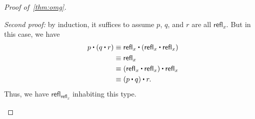 \documentclass[10pt,a4paper]{article}
\newcommand{\jdeq}{\equiv}      %
\newcommand{\refl}[1]{\ensuremath{\mathsf{refl}_{#1}}\xspace}
\newcommand{\ct}{%
  \mathchoice{\mathbin{\raisebox{0.5ex}{$\displaystyle\centerdot$}}}%
             {\mathbin{\raisebox{0.5ex}{$\centerdot$}}}%
             {\mathbin{\raisebox{0.25ex}{$\scriptstyle\,\centerdot\,$}}}%
             {\mathbin{\raisebox{0.1ex}{$\scriptscriptstyle\,\centerdot\,$}}}
}
\theoremstyle{definition}
\theoremstyle{remark}
\numberwithin{equation}{section}
\newcommand{\mentalpause}{\medskip} %
\begin{document}
\begin{proof}[Proof of~\cref{thm:omg}]
\begin{enumerate}
    \mentalpause

    \noindent \emph{Second proof:} by induction, it suffices to assume $p$, $q$, and $r$ are all $\refl x$.
    But in this case, we have
    \begin{align*}
      p\ct (q\ct r)
      &\jdeq \refl{x}\ct(\refl{x}\ct \refl{x})\\
      &\jdeq \refl{x}\\
      &\jdeq (\refl{x}\ct \refl x)\ct \refl x\\
      &\jdeq (p\ct q)\ct r.
    \end{align*}
    Thus, we have $\refl{\refl{x}}$ inhabiting this type. \qedhere
  \end{enumerate}
\end{proof}
\end{document}

